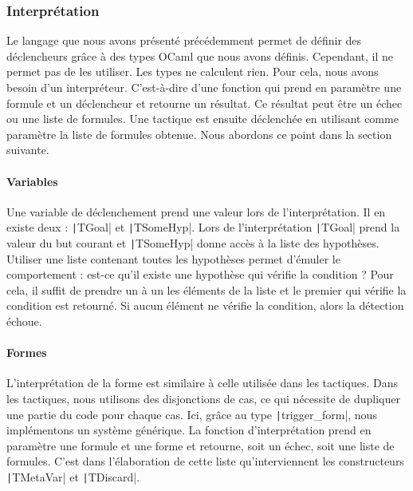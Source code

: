 \documentclass[french,titlepage]{article}
\begin{document}
\subsubsection{Interprétation} \label{realisation:langage_detecter:interpretation}
Le langage que nous avons présenté précédemment permet de définir des déclencheurs grâce à des types OCaml que nous avons définis. Cependant, il ne permet pas de les utiliser. Les types ne calculent rien. Pour cela, nous avons besoin d'un interpréteur. C'est-à-dire d'une fonction qui prend en paramètre une formule et un déclencheur et retourne un résultat. Ce résultat peut être un échec ou une liste de formules. Une tactique est ensuite déclenchée en utilisant comme paramètre la liste de formules obtenue. Nous abordons ce point dans la section suivante.

\paragraph{Variables} \label{realisation:langage_detecter:interpretation:variables}
Une variable de déclenchement prend une valeur lors de l'interprétation. Il en existe deux : \texttt|TGoal| et \texttt|TSomeHyp|. Lors de l'interprétation \texttt|TGoal| prend la valeur du but courant et \texttt|TSomeHyp| donne accès à la liste des hypothèses. Utiliser une liste contenant toutes les hypothèses permet d'émuler le comportement : est-ce qu'il existe une hypothèse qui vérifie la condition ? Pour cela, il suffit de prendre un à un les éléments de la liste et le premier qui vérifie la condition est retourné. Si aucun élément ne vérifie la condition, alors la détection échoue.

\paragraph{Formes} \label{realisation:langage_detecter:interpretation:formes}
L'interprétation de la forme est similaire à celle utilisée dans les tactiques. Dans les tactiques, nous utilisons des disjonctions de cas, ce qui nécessite de dupliquer une partie du code pour chaque cas. Ici, grâce au type \texttt|trigger_form|, nous implémentons un système générique. La fonction d'interprétation prend en paramètre une formule et une forme et retourne, soit un échec, soit une liste de formules. C'est dans l'élaboration de cette liste qu'interviennent les constructeurs \texttt|TMetaVar| et \texttt|TDiscard|.
\end{document}
